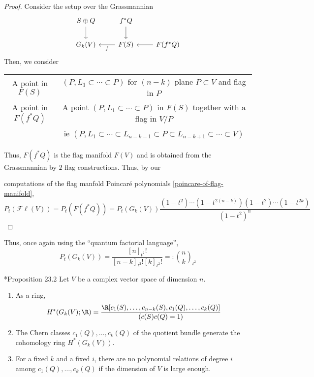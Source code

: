 \documentclass[11pt,leqno,oneside]{amsbook}
\numberwithin{thm}{section}
\newcommand{\Fl}{\mathcal{F\ell}}
\begin{document}
\begin{proof}
  Consider the setup over the Grassmannian
  \[
    \begin{tikzcd}
      S \oplus Q \ar[d]& f^*Q \ar[d]\\
      G_k(V) & \ar[l,"f"] F(S) & \ar[l] F(f^*Q)
    \end{tikzcd}
  \]
  Then, we consider
  \begin{center}
    \begin{tabular}{c|c}
      A point in \(F(S)\)&\((P, L_1 \subset \cdots \subset P)\) for
                           \((n-k)\) plane \(P \subset V\) and flag in
                           \(P\)\\
      A point in \(F(f^*Q)\) & A point \((P,L_1 \subset \cdots \subset
                               P)\) in \(F(S)\) together with a flag
                               in \(V/P\)\\
      & ie \((P, L_1 \subset \cdots \subset L_{n-k-1} \subset P
        \subset L_{n-k+1} \subset \cdots \subset V)\)
    \end{tabular}
  \end{center}
  Thus, \(F(f^*Q)\) is the flag manifold \(F(V)\) and is obtained from
  the Grassmannian by \(2\) flag constructions. Thus, by our

  computations of the flag manfold Poincar\'{e} polynomials \ref{poincare-of-flag-manifold}, \[
    P_t(\Fl(V)) = P_t(F(f^*Q)) = P_t(G_k(V)) \frac{(1-t^2) \cdots (1-t^{2(n-k)})(1-t^2)
    \cdots (1-t^{2k})}{(1-t^2)^{n}}
  \]
\end{proof}
\begin{rmk}
  Thus, once again using the ``quantum factorial language'', \[
    P_t(G_k(V)) = \frac{[n]_{t^2}!}{[n-k]_{t^2}! [k]_{t^2}!} =: \binom{n}{k}_{t^2}
  \]
\end{rmk}
\begin{prop}\label{cohomology-ring-of-grassmannian}
  \cite{bott-tu}*{Proposition 23.2} Let \(V\) be a complex vector
  space of dimension \(n\).
  \begin{enumerate}
  \item As a ring, \[
      H^*(G_k(V);\R) = \frac{\R[c_1(S), \ldots, c_{n-k}(S), c_1(Q),
        \ldots, c_k(Q)]}{(c(S)c(Q)=1)}
    \]
  \item The Chern classes \(c_1(Q) ,\ldots, c_k(Q)\) of the quotient
    bundle generate the cohomology ring \(H^*(G_k(V))\).
  \item For a fixed \(k\) and a fixed \(i\), there are no polynomial
    relations of degree \(i\) among \(c_1(Q), \ldots, c_k(Q)\) if the
    dimension of \(V\) is large enough.
  \end{enumerate}
\end{prop}
\end{document}
